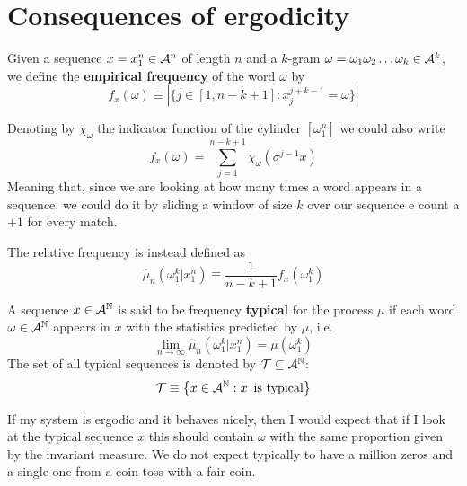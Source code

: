 \section{Consequences of ergodicity}
\begin{definition}
    Given a sequence $x = x_1^n \in \mathcal{A}^n$ of length $n$ and a $k$-gram $\omega = \omega_1 \omega_2 \dots \omega_k \in \mathcal{A}^k$, we define the \textbf{empirical frequency} of the word $\omega$ by 
    \begin{equation}
        f_x(\omega) \equiv | \big\{ j \in [1, n-k+1] : x_j^{j+k-1} = \omega \big\} |
    \end{equation}
\end{definition}
Denoting by $\chi_\omega$ the indicator function of the cylinder $[\omega_1^n]$ we could also write 
\begin{equation}
    f_x(\omega) = \sum_{j=1}^{n-k+1} \chi_\omega (\sigma^{j-1} x)
\end{equation}
Meaning that, since we are looking at how many times a word appears in a sequence, we could do it by sliding a window of size $k$ over our sequence e count a $+1$ for every match. 
\begin{definition}
    The relative frequency is instead defined as 
    \begin{equation}
        \hat{\mu}_n (\omega_1^k | x_1^n) \equiv \frac{1}{n-k+1} f_x(\omega_1^k)
    \end{equation}
\end{definition}
\begin{definition}
    A sequence $x \in \mathcal{A}^{\mathbb{N}}$ is said to be frequency \textbf{typical} for the process $\mu$ if each word $\omega \in \mathcal{A}^{\mathbb{N}}$ appears in $x$ with the statistics predicted by $\mu$, i.e. 
    \begin{equation}
        \lim_{n \rightarrow \infty} \hat{\mu}_n (\omega_1^k | x_1^n) = \mu(\omega_1^k)
    \end{equation}
    The set of all typical sequences is denoted by $\mathcal{T} \subseteq \mathcal{A}^{\mathbb{N}}$: 
    \begin{equation}
        \mathcal{T} \equiv \big\{ x \in \mathcal{A}^{\mathbb{N}} : x \, \, \,\text{is typical} \big\}
    \end{equation}
\end{definition}
If my system is ergodic and it behaves nicely, then I would expect that if I look at the typical sequence $x$ this should contain $\omega$ with the same proportion given by the invariant measure. We do not expect typically to have a million zeros and a single one from a coin toss with a fair coin. 
